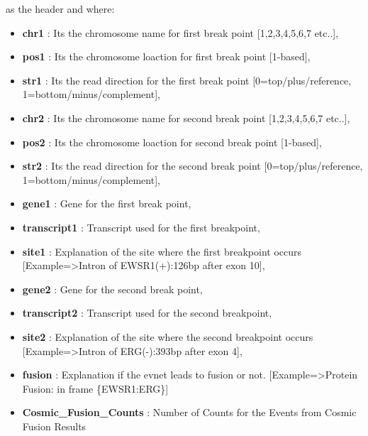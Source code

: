 \documentclass[letterpaper,10pt,english]{sphinxmanual}
\begin{document}
as the header and where:
\begin{itemize}
\item {} 
\textbf{chr1} : Its the chromosome name for first break point {[}1,2,3,4,5,6,7 etc..{]},

\item {} 
\textbf{pos1} : Its the chromosome loaction for first break point {[}1-based{]},

\item {} 
\textbf{str1} : Its the read direction for the first break point {[}0=top/plus/reference, 1=bottom/minus/complement{]},

\item {} 
\textbf{chr2} : Its the chromosome name for second break point {[}1,2,3,4,5,6,7 etc..{]},

\item {} 
\textbf{pos2} : Its the chromosome loaction for second break point {[}1-based{]},

\item {} 
\textbf{str2} : Its the read direction for the second break point {[}0=top/plus/reference, 1=bottom/minus/complement{]},

\item {} 
\textbf{gene1} : Gene for the first break point,

\item {} 
\textbf{transcript1} : Transcript used for the first breakpoint,

\item {} 
\textbf{site1} : Explanation of the site where the first breakpoint occurs {[}Example=\textgreater{}Intron of EWSR1(+):126bp after exon 10{]},

\item {} 
\textbf{gene2} : Gene for the second break point,

\item {} 
\textbf{transcript2} : Transcript used for the second breakpoint,

\item {} 
\textbf{site2} : Explanation of the site where the second breakpoint occurs {[}Example=\textgreater{}Intron of ERG(-):393bp after exon 4{]},

\item {} 
\textbf{fusion} : Explanation if the evnet leads to fusion or not. {[}Example=\textgreater{}Protein Fusion: in frame  \{EWSR1:ERG\}{]}

\item {} 
\textbf{Cosmic\_Fusion\_Counts} : Number of Counts for the Events from Cosmic Fusion Results


\end{itemize}
\end{document}
